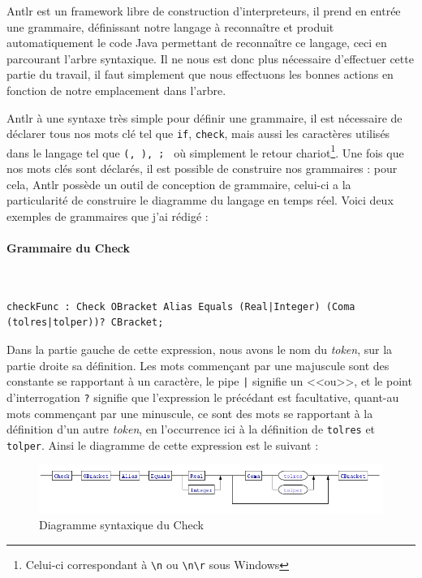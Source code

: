 		Antlr est un framework libre de construction d'interpreteurs, il prend en entrée une grammaire, définissant notre langage à reconnaître et produit automatiquement le code Java permettant de reconnaître ce langage, ceci en parcourant l'arbre syntaxique. Il ne nous est donc plus nécessaire d'effectuer cette partie du travail, il faut simplement que nous effectuons les bonnes actions en fonction de notre emplacement dans l'arbre.

		Antlr à une syntaxe très simple pour définir une grammaire, il est nécessaire de déclarer tous nos mots clé tel que \texttt{if}, \texttt{check}, mais aussi les caractères utilisés dans le langage tel que \texttt{(, ), {; }} où simplement le retour chariot\footnote{Celui-ci correspondant à \texttt{\textbackslash n} ou \texttt{\textbackslash  n\textbackslash r} sous Windows}. Une fois que nos mots clés sont déclarés, il est possible de construire nos grammaires : pour cela, Antlr possède un outil de conception de grammaire, celui-ci a la particularité de construire le diagramme du langage en temps réel. Voici deux exemples de grammaires que j'ai rédigé :

		\paragraph{Grammaire du Check}~\\
\begin{lstlisting}[caption=Grammaire Check, numbers=none]
checkFunc : Check OBracket Alias Equals (Real|Integer) (Coma (tolres|tolper))? CBracket;
\end{lstlisting}
Dans la partie gauche de cette expression, nous avons le nom du \textit{token}, sur la partie droite sa définition. Les mots commençant par une majuscule sont des constante se rapportant à un caractère, le pipe \texttt{|} signifie un <<ou>>, et le point d'interrogation \texttt{?} signifie que l'expression le précédant est facultative, quant-au mots commençant par une minuscule, ce sont des mots se rapportant à la définition d'un autre \textit{token}, en l'occurrence ici à la définition de \texttt{tolres} et \texttt{tolper}. Ainsi le diagramme de cette expression est le suivant : 
\begin{figure}[H]
	\centering
	\includegraphics[width=18cm]{contents/images/check.png}
	\caption{Diagramme syntaxique du Check}
\end{figure}
